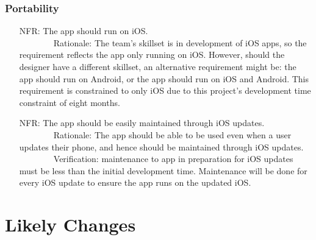 \documentclass[12pt]{article}
\newcounter{nfrnum} %
\begin{document}
\subsubsection{Portability}
\begin{itemize}
\setlength{\itemindent}{.5in}
\item[NFR\refstepcounter{nfrnum}\thenfrnum\label{NFR22}:] The app should run on iOS.
\\ \-\ \-\ \-\ \-\ \-\ \-\ \-\ \-\ Rationale: The team's skillset is in development of iOS apps, so the requirement reflects the app only running on iOS. However, should the designer have a different skillset, an alternative requirement might be: the app should run on Android, or the app should run on iOS and Android. This requirement is constrained to only iOS due to this project's development time constraint of eight months.
\item[NFR\refstepcounter{nfrnum}\thenfrnum\label{NFR23}:] The app should be easily maintained through iOS updates.
\\ \-\ \-\ \-\ \-\ \-\ \-\ \-\ \-\ Rationale: The app should be able to be used even when a user updates their phone, and hence should be maintained through iOS updates.
\\ \-\ \-\ \-\ \-\ \-\ \-\ \-\ \-\ Verification: maintenance to app in preparation for iOS updates must be less than the initial development time. Maintenance will be done for every iOS update to ensure the app runs on the updated iOS.



\end{itemize}




\section{Likely Changes}    
\end{document}
